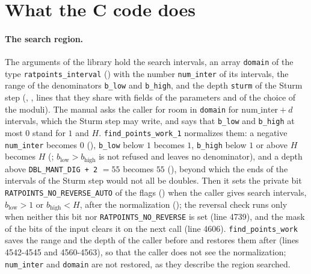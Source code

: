 \section{What the C code does}\label{sec:regionC}

\paragraph{The search region.} The arguments of the library hold the search intervals, an array
\verb|domain| of the type \verb|ratpoints_interval| () with the
number \verb|num_inter| of its intervals, the range of the denominators \verb|b_low| and
\verb|b_high|, and the depth \verb|sturm| of the Sturm step (,
, lines that they share with fields of the parameters and of the
choice of the moduli). The manual asks the caller for room in \verb|domain| for
$\mathrm{num\_inter} + d$ intervals, which the Sturm step may write, and says that \verb|b_low| and
\verb|b_high| at most $0$ stand for $1$ and $H$. \verb|find_points_work_1| normalizes them: a
negative \verb|num_inter| becomes $0$ (), \verb|b_low| below $1$
becomes $1$, \verb|b_high| below $1$ or above $H$ becomes $H$ (;
$b_{\mathrm{low}} > b_{\mathrm{high}}$ is not refused and leaves no denominator), and a depth above
\verb|DBL_MANT_DIG + 2| $= 55$ becomes $55$ (), beyond which the
ends of the intervals of the Sturm step would not all be doubles. Then it sets the private bit
\verb|RATPOINTS_NO_REVERSE_AUTO| of the flags () when the caller
gives search intervals, $b_{\mathrm{low}} > 1$ or $b_{\mathrm{high}} < H$, after the normalization
(); the reversal check runs only when neither this bit nor
\verb|RATPOINTS_NO_REVERSE| is set (line 4739), and the mask of the bits of the input clears it on
the next call (line 4606). \verb|find_points_work| saves the range and the depth of the caller
before and restores them after (lines 4542-4545 and 4560-4563), so that the caller does not see the
normalization; \verb|num_inter| and \verb|domain| are not restored, as they describe the region
searched.

